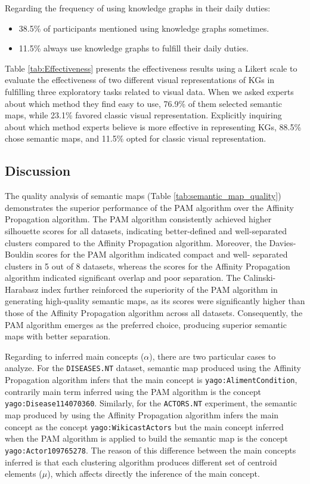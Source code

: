 \documentclass{ieeeaccess}
\begin{document}
Regarding the frequency of using knowledge graphs in their daily duties:

\begin{itemize}
    \item 38.5\% of participants mentioned using knowledge graphs sometimes.
    \item 11.5\% always use knowledge graphs to fulfill their daily duties.
\end{itemize}


Table \ref{tab:Effectiveness} presents the 
effectiveness results using a Likert scale to 
evaluate the effectiveness of two different 
visual representations of KGs in fulfilling three 
exploratory tasks related to visual data. When we
asked experts about which method they find easy 
to use, 76.9\% of them selected semantic maps,
while 23.1\% favored classic visual 
representation. Explicitly inquiring about which 
method experts believe is more
effective in representing KGs, 88.5\% chose 
semantic maps, and 11.5\% opted for classic visual 
representation.


\subsection{Discussion}

The quality analysis of semantic maps 
(Table \ref{tab:semantic_map_quality}) demonstrates
the superior performance of the PAM algorithm over
the Affinity Propagation algorithm. The PAM algorithm
consistently achieved higher silhouette scores for
all datasets, indicating better-defined and 
well-separated clusters compared to the Affinity
Propagation algorithm. Moreover, the Davies-Bouldin
scores for the PAM algorithm indicated compact and well-
separated clusters in 5 out of 8 datasets, whereas
the scores for the Affinity Propagation algorithm
indicated significant overlap and poor separation. 
The Calinski-Harabasz index further reinforced the
superiority of the PAM algorithm in generating
high-quality semantic maps, as its scores were
significantly higher than those of the Affinity
Propagation algorithm across all datasets. Consequently,
the PAM algorithm emerges as the preferred choice,
producing superior semantic maps with better 
separation.

Regarding to inferred main concepts ($\alpha$), there
are two particular cases to analyze. For the \texttt{DISEASES.NT} dataset,
semantic map produced using the Affinity
Propagation algorithm infers that the main concept is \texttt{yago:AlimentCondition}, 
contrarily main term inferred using the PAM algorithm
is the concept \texttt{yago:Disease114070360}. Similarly,
for the \texttt{ACTORS.NT} experiment, the semantic map
produced by using the Affinity Propagation algorithm 
infers the main concept as the concept
\texttt{yago:WikicastActors} but the main concept
inferred when the PAM algorithm is applied to
build the semantic map is the concept 
\texttt{yago:Actor109765278}. The reason
of this difference between the main concepts
inferred is that each clustering algorithm produces 
different set of centroid elements ($\mu$), which
affects directly the inference of the main
concept. 
\end{document}
